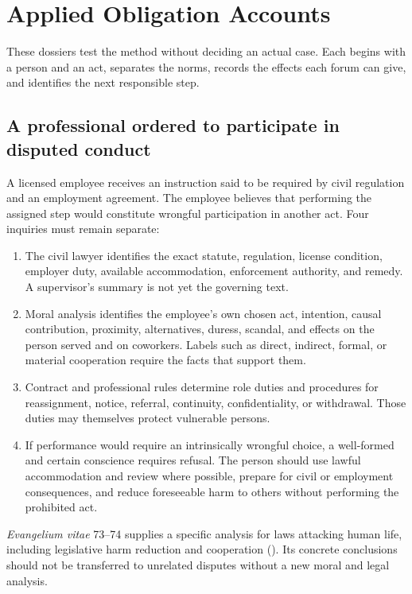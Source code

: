 \section{Applied Obligation Accounts}

These dossiers test the method without deciding an actual case. Each begins with a person and an act, separates the norms, records the effects each forum can give, and identifies the next responsible step.

\subsection{A professional ordered to participate in disputed conduct}

A licensed employee receives an instruction said to be required by civil regulation and an employment agreement. The employee believes that performing the assigned step would constitute wrongful participation in another act. Four inquiries must remain separate:

\begin{enumerate}
\item The civil lawyer identifies the exact statute, regulation, license condition, employer duty, available accommodation, enforcement authority, and remedy. A supervisor's summary is not yet the governing text.
\item Moral analysis identifies the employee's own chosen act, intention, causal contribution, proximity, alternatives, duress, scandal, and effects on the person served and on coworkers. Labels such as direct, indirect, formal, or material cooperation require the facts that support them.
\item Contract and professional rules determine role duties and procedures for reassignment, notice, referral, continuity, confidentiality, or withdrawal. Those duties may themselves protect vulnerable persons.
\item If performance would require an intrinsically wrongful choice, a well-formed and certain conscience requires refusal. The person should use lawful accommodation and review where possible, prepare for civil or employment consequences, and reduce foreseeable harm to others without performing the prohibited act.
\end{enumerate}

\emph{Evangelium vitae} 73--74 supplies a specific analysis for laws attacking human life, including legislative harm reduction and cooperation (). Its concrete conclusions should not be transferred to unrelated disputes without a new moral and legal analysis.

